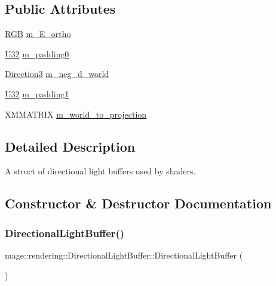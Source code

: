 \subsection*{Public Attributes}
\begin{DoxyCompactItemize}
\item 
\mbox{\hyperlink{structmage_1_1_r_g_b}{R\+GB}} \mbox{\hyperlink{structmage_1_1rendering_1_1_directional_light_buffer_a95dfc58f116bfa54ab2a9b812bc9d5e3}{m\+\_\+\+E\+\_\+ortho}}
\item 
\mbox{\hyperlink{namespacemage_a41c104c036fba3756a74e19f793eeaa1}{U32}} \mbox{\hyperlink{structmage_1_1rendering_1_1_directional_light_buffer_a82d9a78edf5562c3ce041d1a2a7b6a3e}{m\+\_\+padding0}}
\item 
\mbox{\hyperlink{structmage_1_1_direction3}{Direction3}} \mbox{\hyperlink{structmage_1_1rendering_1_1_directional_light_buffer_a44ae081673f5dde10e305a20581e31ef}{m\+\_\+neg\+\_\+d\+\_\+world}}
\item 
\mbox{\hyperlink{namespacemage_a41c104c036fba3756a74e19f793eeaa1}{U32}} \mbox{\hyperlink{structmage_1_1rendering_1_1_directional_light_buffer_a9e86dcc4f68340eb64408cf638996a69}{m\+\_\+padding1}}
\item 
X\+M\+M\+A\+T\+R\+IX \mbox{\hyperlink{structmage_1_1rendering_1_1_directional_light_buffer_ae1c5a43c5dca80be889661a54fb3910b}{m\+\_\+world\+\_\+to\+\_\+projection}}
\end{DoxyCompactItemize}


\subsection{Detailed Description}
A struct of directional light buffers used by shaders. 

\subsection{Constructor \& Destructor Documentation}
\mbox{\label{structmage_1_1rendering_1_1_directional_light_buffer_a618dbd63423f0f008ef18c5e5a7fe560}} 
\subsubsection{\texorpdfstring{Directional\+Light\+Buffer()}{DirectionalLightBuffer()}\hspace{0.1cm}{\footnotesize\ttfamily [1/3]}}
{\footnotesize\ttfamily mage\+::rendering\+::\+Directional\+Light\+Buffer\+::\+Directional\+Light\+Buffer (\begin{DoxyParamCaption}{ }\end{DoxyParamCaption})\hspace{0.3cm}{\ttfamily [noexcept]}}

